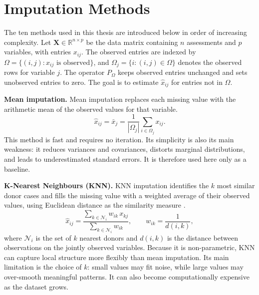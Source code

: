 
\section{Imputation Methods}\label{sec:lit_imputation}

The ten methods used in this thesis are introduced below in order of increasing complexity. Let $\mathbf{X}\in\mathbb{R}^{n\times p}$ be the data matrix containing $n$ assessments and $p$ variables, with entries $x_{ij}$. The observed entries are indexed by $\Omega=\{(i,j):x_{ij}\text{ is observed}\}$, and $\Omega_j=\{i:(i,j)\in\Omega\}$ denotes the observed rows for variable $j$. The operator $P_\Omega$ keeps observed entries unchanged and sets unobserved entries to zero. The goal is to estimate $\hat{x}_{ij}$ for entries not in $\Omega$.

\textbf{Mean imputation.} Mean imputation replaces each missing value with the arithmetic mean of the observed values for that variable.
\begin{equation}\label{eq:mean}
\hat{x}_{ij}=\bar{x}_j=\frac{1}{|\Omega_j|}\sum_{i\in\Omega_j}x_{ij}.
\end{equation}
This method is fast and requires no iteration. Its simplicity is also its main weakness: it reduces variances and covariances, distorts marginal distributions, and leads to underestimated standard errors. It is therefore used here only as a baseline.

\textbf{K-Nearest Neighbours (KNN).} KNN imputation identifies the $k$ most similar donor cases and fills the missing value with a weighted average of their observed values, using Euclidean distance as the similarity measure \parencite{troyanskaya2001missing}.
\begin{equation}\label{eq:knn}
\hat{x}_{ij}=\frac{\sum_{k\in\mathcal{N}_i}w_{ik}\,x_{kj}}{\sum_{k\in\mathcal{N}_i}w_{ik}},\qquad w_{ik}=\frac{1}{d(i,k)},
\end{equation}
where $\mathcal{N}_i$ is the set of $k$ nearest donors and $d(i,k)$ is the distance between observations on the jointly observed variables. Because it is non-parametric, KNN can capture local structure more flexibly than mean imputation. Its main limitation is the choice of $k$: small values may fit noise, while large values may over-smooth meaningful patterns. It can also become computationally expensive as the dataset grows.

